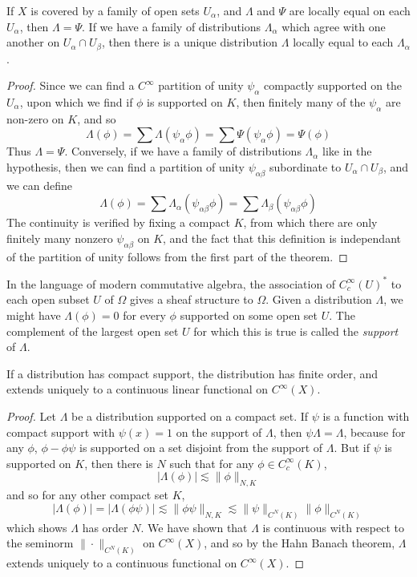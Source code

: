 \begin{theorem}
    If $X$ is covered by a family of open sets $U_\alpha$, and $\Lambda$ and $\Psi$ are locally equal on each $U_\alpha$, then $\Lambda = \Psi$. If we have a family of distributions $\Lambda_\alpha$ which agree with one another on $U_\alpha \cap U_\beta$, then there is a unique distribution $\Lambda$ locally equal to each $\Lambda_\alpha$.
\end{theorem}
\begin{proof}
    Since we can find a $C^\infty$ partition of unity $\psi_\alpha$ compactly supported on the $U_\alpha$, upon which we find if $\phi$ is supported on $K$, then finitely many of the $\psi_\alpha$ are non-zero on $K$, and so
    \[ \Lambda(\phi) = \sum \Lambda(\psi_\alpha \phi) = \sum \Psi(\psi_\alpha \phi) = \Psi(\phi) \]
    Thus $\Lambda = \Psi$. Conversely, if we have a family of distributions $\Lambda_\alpha$ like in the hypothesis, then we can find a partition of unity $\psi_{\alpha \beta}$ subordinate to $U_\alpha \cap U_\beta$, and we can define
    \[ \Lambda(\phi) = \sum \Lambda_\alpha(\psi_{\alpha \beta} \phi) = \sum \Lambda_\beta(\psi_{\alpha \beta} \phi) \]
    The continuity is verified by fixing a compact $K$, from which there are only finitely many nonzero $\psi_{\alpha \beta}$ on $K$, and the fact that this definition is independant of the partition of unity follows from the first part of the theorem.
\end{proof}

In the language of modern commutative algebra, the association of $C_c^\infty(U)^*$ to each open subset $U$ of $\Omega$ gives a sheaf structure to $\Omega$. Given a distribution $\Lambda$, we might have $\Lambda(\phi) = 0$ for every $\phi$ supported on some open set $U$. The complement of the largest open set $U$ for which this is true is called the \emph{support} of $\Lambda$.

\begin{theorem}
    If a distribution has compact support, the distribution has finite order, and extends uniquely to a continuous linear functional on $C^\infty(X)$.
\end{theorem}
\begin{proof}
    Let $\Lambda$ be a distribution supported on a compact set. If $\psi$ is a function with compact support with $\psi(x) = 1$ on the support of $\Lambda$, then $\psi \Lambda = \Lambda$, because for any $\phi$, $\phi - \phi \psi$ is supported on a set disjoint from the support of $\Lambda$. But if $\psi$ is supported on $K$, then there is $N$ such that for any $\phi \in C_c^\infty(K)$,
    \[ |\Lambda(\phi)| \lesssim \| \phi \|_{N,K} \]
    and so for any other compact set $K$,
    \[ |\Lambda(\phi)| = |\Lambda(\phi \psi)| \lesssim \| \phi \psi \|_{N,K} \lesssim \| \psi \|_{C^N(K)} \| \phi \|_{C^N(K)} \]
    which shows $\Lambda$ has order $N$. We have shown that $\Lambda$ is continuous with respect to the seminorm $\| \cdot \|_{C^N(K)}$ on $C^\infty(X)$, and so by the Hahn Banach theorem, $\Lambda$ extends uniquely to a continuous functional on $C^\infty(X)$.
\end{proof}

